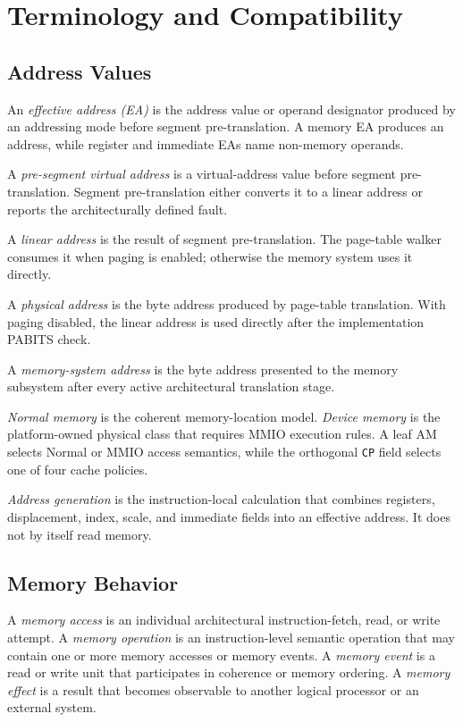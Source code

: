 \clearpage
\section{Terminology and Compatibility}\label{page:terminology-and-compatibility}\label{section:terminology}

\subsection{Address Values}\label{section:address-terminology}

An \emph{effective address (EA)} is the address value or operand designator produced by an addressing mode before
segment pre-translation. A memory EA produces an address, while register and immediate EAs name non-memory operands.

A \emph{pre-segment virtual address} is a virtual-address value before segment pre-translation. Segment
pre-translation either converts it to a linear address or reports the architecturally defined fault.

A \emph{linear address} is the result of segment pre-translation. The page-table walker consumes it when paging is
enabled; otherwise the memory system uses it directly.

A \emph{physical address} is the byte address produced by page-table translation.
With paging disabled, the linear address is used directly after the implementation PABITS check.

A \emph{memory-system address} is the byte address presented to the memory subsystem after every active architectural
translation stage.

\emph{Normal memory} is the coherent memory-location model. \emph{Device
memory} is the platform-owned physical class that requires MMIO execution
rules. A leaf AM selects Normal or MMIO access semantics, while the orthogonal
\texttt{CP} field selects one of four cache policies.

\emph{Address generation} is the instruction-local calculation that combines registers, displacement, index,
scale, and immediate fields into an effective address. It does not by itself read memory.

\subsection{Memory Behavior}\label{section:memory-behavior-terminology}

A \emph{memory access} is an individual architectural instruction-fetch, read, or write attempt. A \emph{memory
operation} is an instruction-level semantic operation that may contain one or more memory accesses or memory events.
A \emph{memory event} is a read or write unit that participates in coherence or memory ordering. A \emph{memory
effect} is a result that becomes observable to another logical processor or an external system.

